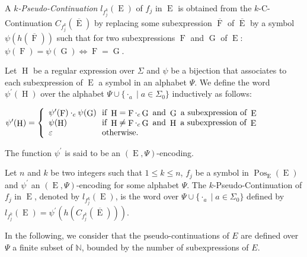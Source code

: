 \documentclass{llncs}
\def\Po#1#2{\Pos_{#1}{(#2)}}
\DeclareMathOperator{\E}{E}
\DeclareMathOperator{\h}{H}
\DeclareMathOperator{\f}{F}
\DeclareMathOperator{\G}{G}
\DeclareMathOperator{\Pos}{Pos}
\def\b#1{\overline{#1}}
\begin{document}
\noindent  A \emph{$k$-Pseudo-Continuation} $l_{f^k_j}(\E)$ of $f_j$ in $\E$ is obtained from the 
 $k$-C-Continuation $C_{f^k_j}(\b\E)$ by replacing some subexpression $\b\f$ of $\b\E$ by a symbol $\psi(h(\b\f))$ such that for two subexpressions 
 $\f$ and $\G$ of $\E$:   
$\psi(\f)=\psi(\G)\Leftrightarrow \f=\G$.


\begin{definition}\label{def2}
Let $\h$ be a regular expression over $\Sigma$ and $\psi$ be a bijection that associates to each subexpression of $\E$ a symbol in an alphabet $\Psi$. We define the word $\psi^\prime(\h)$ over the alphabet $\Psi\cup\{\cdot_a\mid a\in \Sigma_0\}$ inductively as follows:
   
 \centerline{$\psi^\prime(\h)=
      \left\{
        \begin{array}{l@{\ }l}
          \psi^\prime(\f)\cdot_c\psi(\G)& \text{ if } \h=\f\cdot_c\G \text{ and }\G \text{ a subexpression of }\E\\
           \psi(\h)& \text{ if } \h\neq\f\cdot_c\G \text{ and }\h \text{ a subexpression of }\E\\
          \varepsilon & \text{ otherwise}.
        \end{array}
      \right.$}
      
  \noindent The function $\psi^\prime$ is said to be an $(\E,\Psi)$-encoding.
\end{definition}

\begin{definition}
Let $n$ and $k$ be two integers such that $1\leq k\leq n$, $f_j$ be a symbol in $\Po{\E}{\E}$  and $\psi^\prime$ an $(\E,\Psi)$-encoding for some alphabet $\Psi$. The $k$-Pseudo-Continuation of $f_j$ in $\E$, denoted by $l_{f^k_j}(\E)$, is the word over $\Psi\cup\{\cdot_a\mid a\in \Sigma_0\}$ defined by $l_{f^k_j}(\E)=\psi^\prime(h(C_{f^k_j}(\b\E)))$.
\end{definition}

In the following, we consider that the pseudo-continuations of 
$E$
are defined over $\Psi$ a finite subset of $\mathbb{N}$, bounded by the number of subexpressions of $E$.
\end{document}

